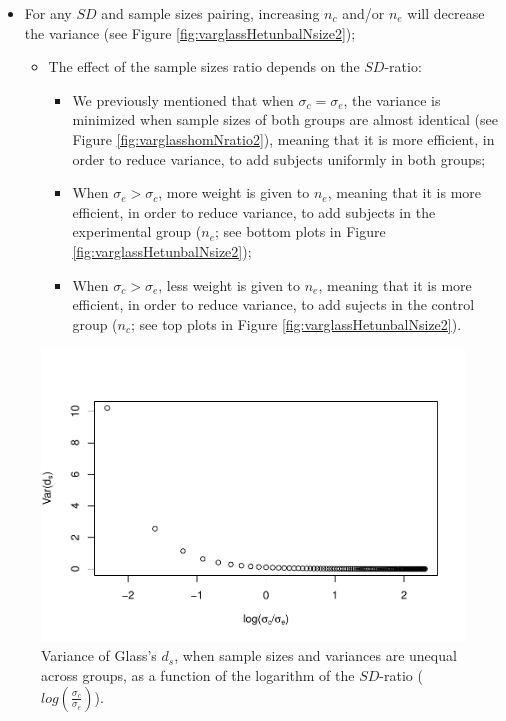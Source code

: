 \documentclass[
  english,
  man,mask]{apa6}
\providecommand{\tightlist}{%
  \setlength{\itemsep}{0pt}\setlength{\parskip}{0pt}}
\begin{document}
\begin{itemize}
\item
  For any \(SD\) and sample sizes pairing, increasing \(n_c\) and/or \(n_e\) will decrease the variance (see Figure \ref{fig:varglassHetunbalNsize2});

  \begin{itemize}
  \tightlist
  \item
    The effect of the sample sizes ratio depends on the \(SD\)-ratio:

    \begin{itemize}
    \tightlist
    \item
      We previously mentioned that when \(\sigma_c=\sigma_e\), the variance is minimized when sample sizes of both groups are almost identical (see Figure \ref{fig:varglasshomNratio2}), meaning that it is more efficient, in order to reduce variance, to add subjects uniformly in both groups;\\
    \item
      When \(\sigma_e > \sigma_c\), more weight is given to \(n_e\), meaning that it is more efficient, in order to reduce variance, to add subjects in the experimental group (\(n_e\); see bottom plots in Figure \ref{fig:varglassHetunbalNsize2});\\
    \item
      When \(\sigma_c > \sigma_e\), less weight is given to \(n_e\), meaning that it is more efficient, in order to reduce variance, to add sujects in the control group (\(n_c\); see top plots in Figure \ref{fig:varglassHetunbalNsize2}).
    \end{itemize}
  \end{itemize}
\end{itemize}

\begin{figure}
\centering
\includegraphics{Theoretical-Variance-of-all-estimators-as-a-function-of-population-parameters_files/figure-latex/varglasshetunbalSDratio2-1.pdf}
\caption{\label{fig:varglasshetunbalSDratio2}Variance of Glass's \(d_s\), when sample sizes and variances are unequal across groups, as a function of the logarithm of the \(SD\)-ratio (\(log \left( \frac{\sigma_c}{\sigma_e} \right)\)).}
\end{figure}
\end{document}
